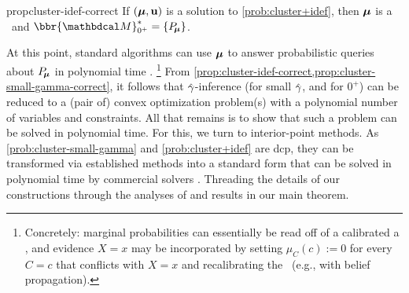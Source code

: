 \begin{linked}{prop}{cluster-idef-correct}
    If $(\boldsymbol\mu, \mathbf u)$ is a solution to \eqref{prob:cluster+idef},
    then $\boldsymbol\mu$ is a \cactree\
    and $\bbr{\dg M}^*_{0^+} = \{ \Pr_{\!\bmu} \}$.
\end{linked}



At this point, standard algorithms can use $\boldsymbol\mu$
to answer probabilistic queries about $P_{\!\boldsymbol\mu}$ in polynomial time \parencite[\S 10.3.3]{KF09}.
\unskip\footnote{%
    Concretely: marginal probabilities can essentially be read off of a calibrated a \actree,
    and evidence $X{=}x$ may be incorporated by
    setting $\mu_C(c) := 0$ for every $C{=}c$ that conflicts with $X{=}x$
    and recalibrating the \actree\ (e.g., with belief propagation). }
From \cref{prop:cluster-idef-correct,prop:cluster-small-gamma-correct}, it follows that
$\zogamma$-inference
(for small $\zogamma$, and for $0^+$)
can be reduced to a (pair of) convex optimization problem(s) with
a polynomial number of variables and constraints.
All that remains 
is to show that such a problem can be solved in polynomial time.
For this, we turn to interior-point methods.
As
\eqref{prob:cluster-small-gamma} and \eqref{prob:cluster+idef} are dcp, they
can be transformed via established methods \parencite{agrawal2018rewriting} into
a standard form
that can be solved in polynomial time by commercial solvers \parencite{mosek,ECOS}.
Threading the details of our constructions through
the analyses of \textcite{dahl2022primal}
and \textcite{nesterov1996infeasible}
results in
our main theorem.


